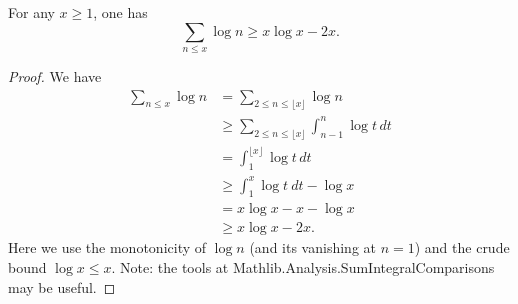 \begin{corollary}
\label{Mertens-sum-log-ge}
\leanok
For any $x \geq 1$, one has
$$ \sum_{n \leq x} \log n \geq x \log x - 2 x.$$
\end{corollary}
\begin{proof}
\leanok
We have
 \begin{align*}
 \sum_{n \leq x} \log n &= \sum_{2 \leq n \leq \lfloor x \rfloor} \log n \\
 &\geq \sum_{2 \leq n \leq \lfloor x \rfloor} \int_{n-1}^n \log t \, dt \\
 &= \int_1^{\lfloor x \rfloor} \log t \, dt \\
 &\geq \int_1^x \log t\ dt - \log x \\
 &= x \log x - x - \log x \\
 &\geq x \log x - 2 x.
\end{align*}
Here we use the monotonicity of $\log n$ (and its vanishing at $n=1$) and the crude bound $\log x \leq x$. Note: the tools at Mathlib.Analysis.SumIntegralComparisons may be useful.
\end{proof}
